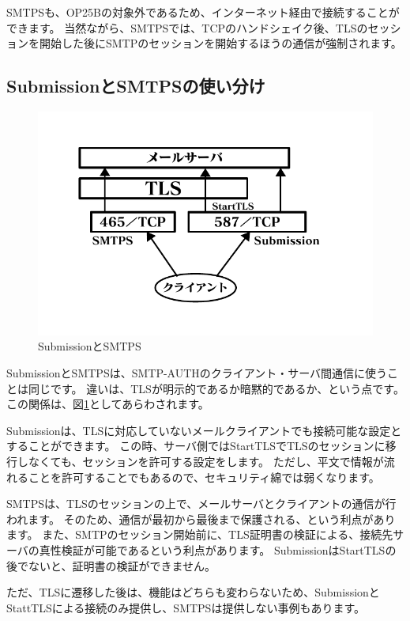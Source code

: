 SMTPSも、OP25Bの対象外であるため、インターネット経由で接続することができます。
当然ながら、SMTPSでは、TCPのハンドシェイク後、TLSのセッションを開始した後にSMTPのセッションを開始するほうの通信が強制されます。

\subsection{SubmissionとSMTPSの使い分け}

\begin{figure}[htbp]
	\includegraphics[width=12cm,clip]{draw/withtls.pdf}
	\caption{SubmissionとSMTPS}
	\label{fig:submission_smtps}
\end{figure}

SubmissionとSMTPSは、SMTP-AUTHのクライアント・サーバ間通信に使うことは同じです。
違いは、TLSが明示的であるか暗黙的であるか、という点です。
この関係は、図\ref{fig:submission_smtps}としてあらわされます。

Submissionは、TLSに対応していないメールクライアントでも接続可能な設定とすることができます。
この時、サーバ側ではStartTLSでTLSのセッションに移行しなくても、セッションを許可する設定をします。
ただし、平文で情報が流れることを許可することでもあるので、セキュリティ綿では弱くなります。

SMTPSは、TLSのセッションの上で、メールサーバとクライアントの通信が行われます。
そのため、通信が最初から最後まで保護される、という利点があります。
また、SMTPのセッション開始前に、TLS証明書の検証による、接続先サーバの真性検証が可能であるという利点があります。
SubmissionはStartTLSの後でないと、証明書の検証ができません。

ただ、TLSに遷移した後は、機能はどちらも変わらないため、SubmissionとStattTLSによる接続のみ提供し、SMTPSは提供しない事例もあります。


